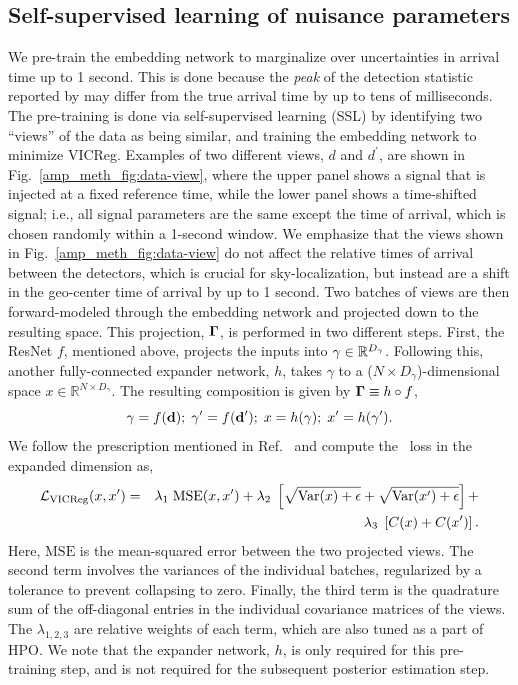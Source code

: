 \begin{refsection}
\subsection{\label{amp_meth_sec:ssl}Self-supervised learning of nuisance parameters}
We pre-train the embedding network to marginalize over uncertainties in arrival time up to 1 second.
This is done because the \emph{peak} of the detection statistic reported by {\aframe} may differ from the true arrival time by up to tens of milliseconds. 
The pre-training is done via self-supervised learning (SSL) by identifying two ``views'' of the data as being similar, and training the embedding network to minimize VICReg. 
Examples of two different views, $d$ and $d^\prime$, are shown in Fig.~\ref{amp_meth_fig:data-view}, where the upper panel shows a signal that
is injected at a fixed reference time, while the lower panel shows a time-shifted signal; i.e., all signal parameters are the same except the time of arrival, which is chosen randomly within a 1-second window.
We emphasize that the views shown in Fig.~\ref{amp_meth_fig:data-view} do not affect the relative times of arrival between the detectors, which is crucial for sky-localization, but instead are a shift in the geo-center time of arrival by up to 1 second.
Two batches of views are then forward-modeled through the embedding network and projected down to the resulting space. 
This projection, $\mathbf{\Gamma}$, is performed in two different steps. 
First, the ResNet $f$, mentioned above, projects the inputs into $\mathbf{\gamma}\in\mathbb{R}^{D_{\gamma}}$. 
Following this, another fully-connected expander network, $h$, takes $\gamma$ to a ($N\times D_{\gamma}$)-dimensional space $x\in\mathbb{R}^{N\times D_{\gamma}}$. 
The resulting composition is given by  $\mathbf{\Gamma} \equiv h\circ f$,
\begin{equation}
    \mathbf{\gamma} = f(\mathbf{d});\;\mathbf{\gamma}' = f(\mathbf{d}');\;x = h(\mathbf{\gamma});\;x' = h(\mathbf{\gamma}').
    \label{eq:representation}
\end{equation}
We follow the prescription mentioned in Ref.~\cite{bardes2022vicreg} and compute the \vicreg~loss in the expanded dimension as,
\begin{eqnarray}
    \mathcal{L}_{\mathrm{VICReg}}(x, x') &=& \lambda_1\;\mathrm{MSE}(x, x') +
      \lambda_2\;\left[\sqrt{\mathrm{Var}(x) + \epsilon} + \sqrt{\mathrm{Var}(x') + \epsilon}\right] + \nonumber \\
      &&\lambda_3\;\left[C(x) + C(x')\right].
  \label{eq:loss}
\end{eqnarray}
Here, $\mathrm{MSE}$ is the mean-squared error between the two projected views. 
The second term involves the variances of the individual batches, regularized by a tolerance to prevent collapsing to zero. 
Finally, the third term is the quadrature sum of the off-diagonal entries in the individual covariance matrices of the views.
The $\lambda_{1,2,3}$ are relative weights of each term, which are also tuned as a part of HPO. 
We note that the expander network, $h$, is only required for this pre-training step, and is not required for the subsequent posterior estimation step.


\end{refsection}
